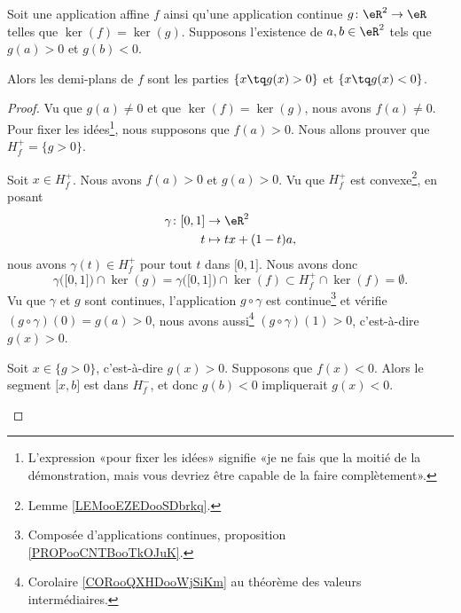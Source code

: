 \begin{lemma}       \label{LEMooURPNooYRsuaI}
	Soit une application affine \( f\) ainsi qu'une application continue \( g\colon \eR^2\to \eR\) telles que \( \ker(f)=\ker(g)\). Supposons l'existence de \( a,b\in \eR^2\) tels que \( g(a)>0\) et \( g(b)<0\).

	Alors les demi-plans de \( f\) sont les parties \( \{ x\tq g(x)>0 \}\) et \( \{ x\tq g(x)<0 \}\).
\end{lemma}

\begin{proof}
	Vu que \( g(a)\neq 0\) et que \( \ker(f)=\ker(g)\), nous avons \( f(a)\neq 0\). Pour fixer les idées\footnote{L'expression «pour fixer les idées» signifie «je ne fais que la moitié de la démonstration, mais vous devriez être capable de la faire complètement».}, nous supposons que \( f(a)>0\). Nous allons prouver que \( H_f^+=\{ g>0 \}\).

	\begin{subproof}
		\spitem[\( H_f^+\subset\{ g>0 \}\)]
		Soit \( x\in H_f^+\). Nous avons \( f(a)>0\) et \( g(a)>0\). Vu que \( H_f^+\) est convexe\footnote{Lemme \ref{LEMooEZEDooSDbrkq}.}, en posant
		\begin{equation}
			\begin{aligned}
				\gamma\colon \mathopen[ 0,1\mathclose] & \to \eR^2             \\
				t                                      & \mapsto tx+(1-t)a   ,
			\end{aligned}
		\end{equation}
		nous avons \( \gamma(t)\in H_f^+\) pour tout \( t\) dans \( \mathopen[ 0,1\mathclose]\). Nous avons donc
		\begin{equation}
			\gamma\big( \mathopen[ 0,1\mathclose] \big)\cap\ker(g)= 			\gamma\big( \mathopen[ 0,1\mathclose] \big)\cap\ker(f)\subset H^+_f\cap\ker(f)=\emptyset.
		\end{equation}
		Vu que \( \gamma\) et \( g\) sont continues, l'application \( g\circ\gamma\) est continue\footnote{Composée d'applications continues, proposition \ref{PROPooCNTBooTkOJuK}.} et vérifie \( (g\circ \gamma)(0)=g(a)>0\), nous avons aussi\footnote{Corolaire \ref{CORooQXHDooWjSiKm} au théorème des valeurs intermédiaires.} \( (g\circ\gamma)(1)>0\), c'est-à-dire \( g(x)>0\).

		\spitem[\( \{ g>0 \}\subset H_f^+\)]
		Soit \( x\in \{ g>0 \}\), c'est-à-dire \( g(x)>0\). Supposons que \( f(x)<0\). Alors le segment \( \mathopen[ x,b\mathclose]\) est dans \( H_f^-\), et donc \( g(b)<0\) impliquerait \( g(x)<0\).
	\end{subproof}
\end{proof}

